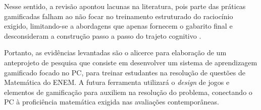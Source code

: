 \documentclass[12pt]{article}
\begin{document}
Nesse sentido, a revisão apontou lacunas na literatura, pois parte das práticas gamificadas falham ao não focar no treinamento estruturado do raciocínio exigido, limitando-se a abordagens que apenas fornecem o gabarito final e desconsideram a construção passo a passo do trajeto cognitivo \cite{atin2022implementation}. 

Portanto, as evidências levantadas são o alicerce para elaboração de um anteprojeto de pesquisa que consiste em desenvolver um sistema de aprendizagem gamificado focado no PC, para treinar estudantes na resolução de questões de Matemática do ENEM. A futura ferramenta utilizará o \textit{design} de jogos e elementos de gamificação para  auxiliem na resolução do problema, conectando o PC à proficiência matemática exigida nas avaliações contemporâneas.
\newpage



\begin{landscape}

\end{landscape}
\end{document}
